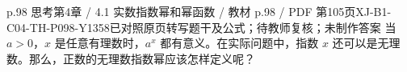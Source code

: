 \par\noindent\begin{minipage}{\linewidth}
\begin{bankitem}{p.98 思考}{第4章 / 4.1 实数指数幂和幂函数 / 教材 p.98 / PDF 第105页}{XJ-B1-C04-TH-P098-Y1358}{已对照原页转写题干及公式；待教师复核；未制作答案}
当 $a>0$，$x$ 是任意有理数时，$a^x$ 都有意义。在实际问题中，指数 $x$ 还可以是无理数。那么，正数的无理数指数幂应该怎样定义呢？
\end{bankitem}
\end{minipage}\par\medskip
